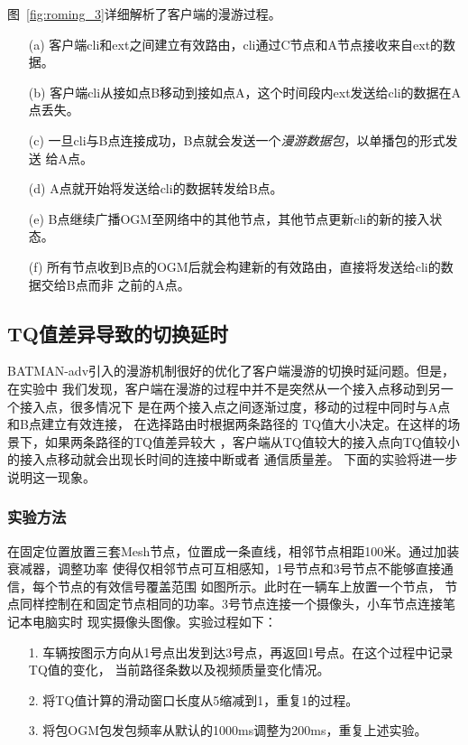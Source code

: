 图~\ref{fig:roming_3}详细解析了客户端的漫游过程。
\begin{itemize}
\item[(a)] 客户端cli和ext之间建立有效路由，cli通过C节点和A节点接收来自ext的数据。
\item[(b)] 客户端cli从接如点B移动到接如点A，这个时间段内ext发送给cli的数据在A点丢失。
\item[(c)] 一旦cli与B点连接成功，B点就会发送一个\emph{漫游数据包}，以单播包的形式发送
给A点。
\item[(d)] A点就开始将发送给cli的数据转发给B点。
\item[(e)] B点继续广播OGM至网络中的其他节点，其他节点更新cli的新的接入状态。
\item[(f)] 所有节点收到B点的OGM后就会构建新的有效路由，直接将发送给cli的数据交给B点而非
之前的A点。
\end{itemize}

\subsection{TQ值差异导致的切换延时}
BATMAN-adv引入的漫游机制很好的优化了客户端漫游的切换时延问题。但是，在实验中
我们发现，客户端在漫游的过程中并不是突然从一个接入点移动到另一个接入点，很多情况下
是在两个接入点之间逐渐过度，移动的过程中同时与A点和B点建立有效连接，
在选择路由时根据两条路径的
TQ值大小决定。在这样的场景下，如果两条路径的TQ值差异较大
，客户端从TQ值较大的接入点向TQ值较小的接入点移动就会出现长时间的连接中断或者
通信质量差。
下面的实验将进一步说明这一现象。

\renewcommand{\thesubsubsection}{\Alph{subsubsection}.}
\subsubsection{实验方法}
在固定位置放置三套Mesh节点，位置成一条直线，相邻节点相距100米。通过加装衰减器，调整功率
使得仅相邻节点可互相感知，1号节点和3号节点不能够直接通信，每个节点的有效信号覆盖范围
如图所示。此时在一辆车上放置一个节点，
节点同样控制在和固定节点相同的功率。3号节点连接一个摄像头，小车节点连接笔记本电脑实时
现实摄像头图像。实验过程如下：
\begin{itemize}
\item[1.] 车辆按图示方向从1号点出发到达3号点，再返回1号点。在这个过程中记录TQ值的变化，
当前路径条数以及视频质量变化情况。
\item[2.] 将TQ值计算的滑动窗口长度从5缩减到1，重复1的过程。
\item[3.] 将包OGM包发包频率从默认的1000ms调整为200ms，重复上述实验。
\end{itemize}

